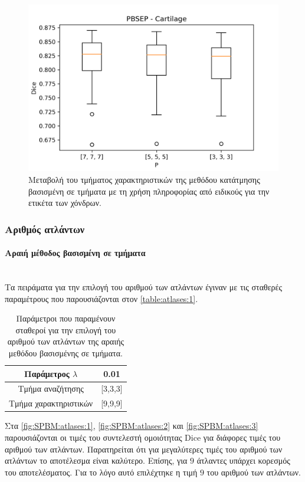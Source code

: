 \documentclass[a4paper,12pt]{article}
\newcommand{\paragraphLine}[1]{\paragraph{#1}\mbox{}\\}
\begin{document}
\begin{figure}[H]
    \centering
    \includegraphics[width=0.85\linewidth]{PBSEP_P_Cartilage_plot.png}
    \caption{Μεταβολή του τμήματος χαρακτηριστικών της μεθόδου κατάτμησης
             βασισμένη σε τμήματα με τη χρήση πληροφορίας από ειδικούς για την
             ετικέτα των χόνδρων.}
    \label{fig:PBSEP:P:3}
\end{figure}

\subsubsection{Αριθμός ατλάντων}

\paragraphLine{Αραιή μέθοδος βασισμένη σε τμήματα}

Τα πειράματα για την επιλογή του αριθμού των ατλάντων έγιναν με τις σταθερές
παραμέτρους που παρουσιάζονται στον \autoref{table:atlases:1}.

\begin{table}[h!]
    \centering
    \begin{tabular}{|c|c|} 
        \hline
        Παράμετρος $\lambda$ & 0.01 \\ 
        \hline
        Τμήμα αναζήτησης & [3,3,3] \\ 
        \hline
        Τμήμα χαρακτηριστικών & [9,9,9] \\ 
        \hline
    \end{tabular}
    \caption{Παράμετροι που παραμένουν σταθεροί για την επιλογή του αριθμού των
             ατλάντων της αραιής μεθόδου βασισμένης σε τμήματα.}
    \label{table:atlases:1}
\end{table}

Στα \autoref{fig:SPBM:atlases:1}, \autoref{fig:SPBM:atlases:2} και
\autoref{fig:SPBM:atlases:3} παρουσιάζονται οι τιμές του συντελεστή ομοιότητας
Dice για διάφορες τιμές του αριθμού των ατλάντων. Παρατηρείται ότι για
μεγαλύτερες τιμές του αριθμού των ατλάντων το αποτέλεσμα είναι καλύτερο. Επίσης,
για $9$ άτλαντες υπάρχει κορεσμός του αποτελέσματος. Για το λόγο αυτό επιλέχτηκε
η τιμή $9$ του αριθμού των ατλάντων.
\end{document}
